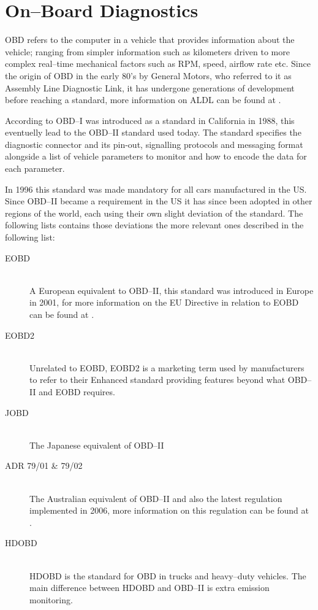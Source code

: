 \section{On--Board Diagnostics}\label{sec:on_board_diagnostics}
\ac{OBD} refers to the computer in a vehicle that provides information about the vehicle;
ranging from simpler information such as kilometers driven to more complex real--time mechanical factors such as RPM, speed, airflow rate etc.
Since the origin of \ac{OBD} in the early 80's by General Motors, who referred to it as Assembly Line Diagnostic Link, it has undergone generations of development before reaching a standard, more information on ALDL can be found at \cite{ALDL}.

According to \cite{CaliforniaEPA} OBD--I was introduced as a standard in California in 1988, this eventuelly lead to the OBD--II standard used today.
The standard specifies the diagnostic connector and its pin-out, signalling protocols and messaging format alongside a list of vehicle parameters to monitor and how to encode the data for each parameter.

In 1996 this standard was made mandatory for all cars manufactured in the US.
Since OBD--II became a requirement in the US it has since been adopted in other regions of the world, each using their own slight deviation of the standard.
The following lists contains those deviations the more relevant ones described in the following list:

\begin{description}
    \item[EOBD]\hfill\\
        A European equivalent to OBD--II, this standard was introduced in Europe in 2001, for more information on the EU Directive in relation to EOBD can be found at \cite{EUDirective}.
    \item[EOBD2]\hfill\\
        Unrelated to EOBD, EOBD2 is a marketing term used by manufacturers to refer to their Enhanced standard providing features beyond what OBD--II and EOBD requires.
    \item[JOBD]\hfill\\
        The Japanese equivalent of OBD--II
    \item[ADR 79/01 \& 79/02]\hfill\\
        The Australian equivalent of OBD--II and also the latest regulation implemented in 2006, more information on this regulation can be found at \cite{AustralianRegulation}.
    \item[HDOBD]\hfill\\
        \ac{HDOBD} is the standard for \ac{OBD} in trucks and heavy--duty vehicles.
        The main difference between \ac{HDOBD} and OBD--II is extra emission monitoring\cite{hdobd}.
\end{description}

